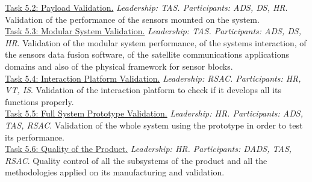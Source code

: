 \begin{table}[H]
\begin{tabular}
{{		\underline{Task 5.2: Payload Validation.} \textit{Leadership: TAS. Participants: ADS, DS, HR}. Validation of the performance of the sensors mounted on the system. \\

		\underline{Task 5.3: Modular System Validation.} \textit{Leadership: TAS. Participants: ADS, DS, HR}. Validation of the modular system performance, of the systems interaction, of the sensors data fusion software, of the satellite communications applications domains and also of the physical framework for sensor blocks.\\

		\underline{Task 5.4: Interaction Platform Validation.} \textit{Leadership: RSAC. Participants: HR, VT, IS}. Validation of the interaction platform to check if it develops all its functions properly.\\

		\underline{Task 5.5: Full System Prototype Validation.} \textit{Leadership: HR. Participants: ADS, TAS, RSAC}. Validation of the whole system using the prototype in order to test its performance.\\

		\underline{Task 5.6: Quality of the Product.} \textit{Leadership: HR. Participants: DADS, TAS, RSAC}. Quality control of all the subsystems of the product and all the methodologies applied on its manufacturing and validation.\\
		
		 }}\\
		 \hline 
		 
		 \\
		 
		 \hline 
		 
		\end{tabular}
		
		\caption{WP5 description}
		
\end{table}



